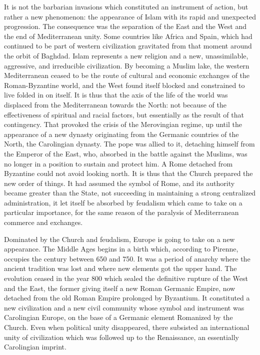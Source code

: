 It is not the barbarian invasions which constituted an instrument of action, but rather a new phenomenon: the appearance of Islam with its rapid and unexpected progression. The consequence was the separation of the East and the West and the end of Mediterranean unity. Some countries like Africa and Spain, which had continued to be part of western civilization gravitated from that moment around the orbit of Baghdad. Islam represents a new religion and a new, unassimilable, aggressive, and irreducible civilization. By becoming a Muslim lake, the western Mediterranean ceased to be the route of cultural and economic exchanges of the Roman-Byzantine world, and the West found itself blocked and constrained to live folded in on itself. It is thus that the axis of the life of the world was displaced from the Mediterranean towards the North: not because of the effectiveness of spiritual and racial factors, but essentially as the result of that contingency. That provoked the crisis of the Merovingian regime, up until the appearance of a new dynasty originating from the Germanic countries of the North, the Carolingian dynasty. The pope was allied to it, detaching himself from the Emperor of the East, who, absorbed in the battle against the Muslims, was no longer in a position to sustain and protect him. A Rome detached from Byzantine could not avoid looking north. It is thus that the Church prepared the new order of things. It had assumed the symbol of Rome, and its authority became greater than the State, not succeeding in maintaining a strong centralized administration, it let itself be absorbed by feudalism which came to take on a particular importance, for the same reason of the paralysis of Mediterranean commerce and exchanges.

Dominated by the Church and feudalism, Europe is going to take on a new appearance. The Middle Ages begins in a birth which, according to Pirenne, occupies the century between 650 and 750. It was a period of anarchy where the ancient tradition was lost and where new elements got the upper hand. The evolution ceased in the year 800 which sealed the definitive rupture of the West and the East, the former giving itself a new Roman Germanic Empire, now detached from the old Roman Empire prolonged by Byzantium. It constituted a new civilization and a new civil community whose symbol and instrument was Carolingian Europe, on the base of a Germanic element Romanized by the Church. Even when political unity disappeared, there subsisted an international unity of civilization which was followed up to the Renaissance, an essentially Carolingian imprint.

